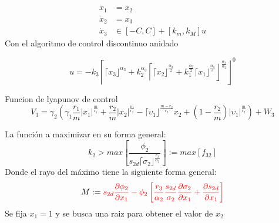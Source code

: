   \begin{equation}
      \begin{split}
      \dot{x}_1&=x_2\\
      \dot{x}_2&=x_3\\
      \dot{x}_3& \in [-C,C]+ [k_m, k_M] u
      \end{split}
      \label{inclusion2}
  \end{equation}
  Con el algoritmo de control discontinuo anidado

    \begin{equation}
      u=-k_3 \left\lceil \lceil x_3 \rfloor^{\alpha_3}+k_2^{\alpha_3}\left\lceil \lceil x_2 \rfloor^{\frac{\alpha_2}{2}}+k_1^{\frac{\alpha_2}{2}} \lceil x_1 \rfloor^{\frac{\alpha_2}{3}}  \right\rfloor^{\frac{\alpha_3}{\alpha_2}} \right\rfloor^0
    \end{equation}
    
    Funcion de lyapunov de control
    \begin{equation}
      V_3=\gamma_2\left(\gamma_1 \frac{r_1}{m} |x_1|^{\frac{m}{r_1}}+\frac{r_2}{m} |x_2|^{\frac{m}{r_2}}-\lceil \upsilon_1 \rfloor^{\frac{m-r_2}{r_2}} x_2 + \left(1-\frac{r_2}{m}\right)|\upsilon_1|^{\frac{m}{r_2}}\right) +W_3
    \end{equation}

    La función a maximizar en su forma general:
    \begin{equation}
    k_2> max \left[ \frac{ \phi_2}{s_{2d} \lceil \sigma_2 \rfloor^{\frac{r_3}{\alpha_2}}} \right]:=max \left[ f_{32} \right]
  \end{equation}
Donde el rayo del máximo tiene la siguiente forma general:
  \begin{equation*}
    M:=\textcolor{red}{s_{2d} \frac{\partial \phi_2}{\partial x_1}- \phi_2 \left[ \frac{r_3}{\alpha_2} \frac{s_{2d} }{\sigma_2}  \frac{\partial \sigma_2}{\partial x_1} +  \frac{\partial s_{2d}}{\partial x_1}  \right]}
  \end{equation*}
Se fija $x_1=1$ y se busca una raiz para obtener el valor de $x_2$

